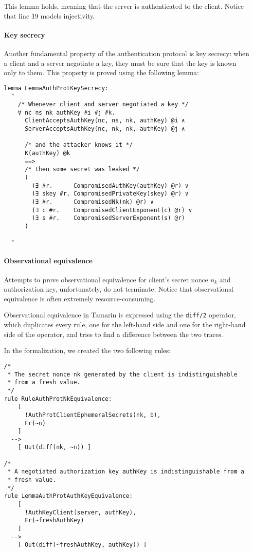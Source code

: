This lemma holds, meaning that the server is authenticated to the client. Notice that line 19 models injectivity.

\paragraph{Key secrecy}
Another fundamental property of the authentication protocol is key secrecy: when a client and a server negotiate a key, they must be sure that the key is known only to them. This property is proved using the following lemma:
\begin{lstlisting}
lemma LemmaAuthProtKeySecrecy:
  "
    /* Whenever client and server negotiated a key */
    ∀ nc ns nk authKey #i #j #k.
      ClientAcceptsAuthKey(nc, ns, nk, authKey) @i ∧
      ServerAcceptsAuthKey(nc, nk, nk, authKey) @j ∧

      /* and the attacker knows it */
      K(authKey) @k
      ==>
      /* then some secret was leaked */
      (
        (∃ #r.      CompromisedAuthKey(authKey) @r) ∨
        (∃ skey #r. CompromisedPrivateKey(skey) @r) ∨
        (∃ #r.      CompromisedNk(nk) @r) ∨
        (∃ c #r.    CompromisedClientExponent(c) @r) ∨
        (∃ s #r.    CompromisedServerExponent(s) @r)
      )

  "
\end{lstlisting}

\paragraph{Observational equivalence}
Attempts to prove observational equivalence for client's secret nonce $n_k$ and authorization key, unfortunately, do not terminate. Notice that observational equivalence is often extremely resource-consuming.

Observational equivalence in Tamarin is expressed using the \lstinline{diff/2} operator, which duplicates every rule, one for the left-hand side and one for the right-hand side of the operator, and tries to find a difference between the two traces.

In the formalization, we created the two following rules:

\begin{lstlisting}
/*
 * The secret nonce nk generated by the client is indistinguishable 
 * from a fresh value.
 */
rule RuleAuthProtNkEquivalence:
    [
      !AuthProtClientEphemeralSecrets(nk, b),
      Fr(~n)
    ]
  -->
    [ Out(diff(nk, ~n)) ]

/*
 * A negotiated authorization key authKey is indistinguishable from a 
 * fresh value.
 */
rule LemmaAuthProtAuthKeyEquivalence:
    [
      !AuthKeyClient(server, authKey),
      Fr(~freshAuthKey)
    ]
  -->
    [ Out(diff(~freshAuthKey, authKey)) ]
\end{lstlisting}





